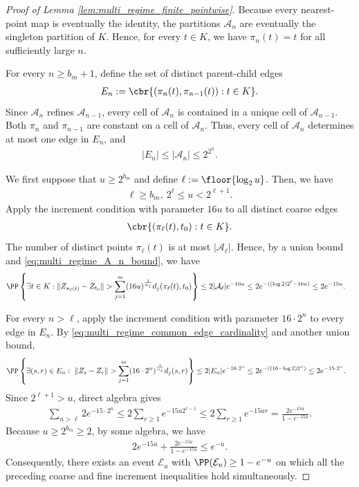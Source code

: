 \documentclass[11pt]{article}
\begin{document}
\begin{proof}[Proof of Lemma \ref{lem:multi_regime_finite_pointwise}]
Because every nearest-point map is eventually the identity, the
partitions $\mathcal A_n$ are eventually the singleton partition of
$K$. Hence, for every $t\in K$, we have
$\pi_n(t)=t$ for all sufficiently large $n$.

For every $n\ge b_m+1$, define the set of distinct parent-child edges
\begin{align*}
E_n
:=
\cbr{
(\pi_n(t),\pi_{n-1}(t)):
t\in K
}.
\end{align*}
Since $\mathcal A_n$ refines $\mathcal A_{n-1}$, every cell of
$\mathcal A_n$ is contained in a unique cell of
$\mathcal A_{n-1}$. Both $\pi_n$ and $\pi_{n-1}$ are constant on a
cell of $\mathcal A_n$. Thus, every cell of $\mathcal A_n$ determines
at most one edge in $E_n$, and
\begin{align}
|E_n|
\le
|\mathcal A_n|
\le
2^{2^n}.
\label{eq:multi_regime_common_edge_cardinality}
\end{align}

We first suppose that $u\ge2^{b_m}$ and define $\ell:=\floor{\log_2u}$.
Then, we have
\begin{align*}
\ell\ge b_m,
\ 
2^\ell\le u<2^{\ell+1}.
\end{align*}
Apply the increment condition with parameter $16u$ to all
distinct coarse edges
\begin{align*}
\cbr{(\pi_\ell(t),t_0):t\in K}.
\end{align*}
The number of distinct points $\pi_\ell(t)$ is at most
$|\mathcal A_\ell|$. Hence, by a union bound and \eqref{eq:multi_regime_A_n_bound}, we have
\begin{align*}
&\PP\left\{
\exists t\in K:
\|Z_{\pi_\ell(t)}-Z_{t_0}\|
>
\sum_{j=1}^m(16u)^{\frac{1}{\alpha_j}}
d_j(\pi_\ell(t),t_0)
\right\}\le
2|\mathcal A_\ell|e^{-16u}\le
2e^{-((\log2)2^\ell-16u)}\le
2e^{-15u}.
\end{align*}

For every $n>\ell$, apply the increment condition with parameter
$16\cdot2^n$ to every edge in $E_n$. By
\eqref{eq:multi_regime_common_edge_cardinality} and another union
bound,
\begin{align*}
&\PP\left\{
\exists(s,r)\in E_n:\
\|Z_s-Z_r\|
>
\sum_{j=1}^m(16\cdot2^n)^{\frac{1}{\alpha_j}}d_j(s,r)
\right\}\le
2|E_n|e^{-16\cdot2^n}\le
2e^{-((16-\log2)2^n)}\le
2e^{-15\cdot2^n}.
\end{align*}
Since $2^{\ell+1}>u$, direct algebra gives
\begin{align*}
\sum_{n>\ell}2e^{-15\cdot2^n}\le
2\sum_{r\ge1}e^{-15u2^{r-1}}\le
2\sum_{r\ge1}e^{-15ur}=
\frac{2e^{-15u}}{1-e^{-15u}}.
\end{align*}
Because $u\ge2^{b_m}\ge2$, by some algebra, we have
\begin{align*}
2e^{-15u}
+
\frac{2e^{-15u}}{1-e^{-15u}}
\le
e^{-u}.
\end{align*}
Consequently, there exists an event $\mathcal E_u$ with
$\PP(\mathcal E_u)\ge1-e^{-u}$ on which all the preceding coarse and
fine increment inequalities hold simultaneously.


\end{proof}
\end{document}
